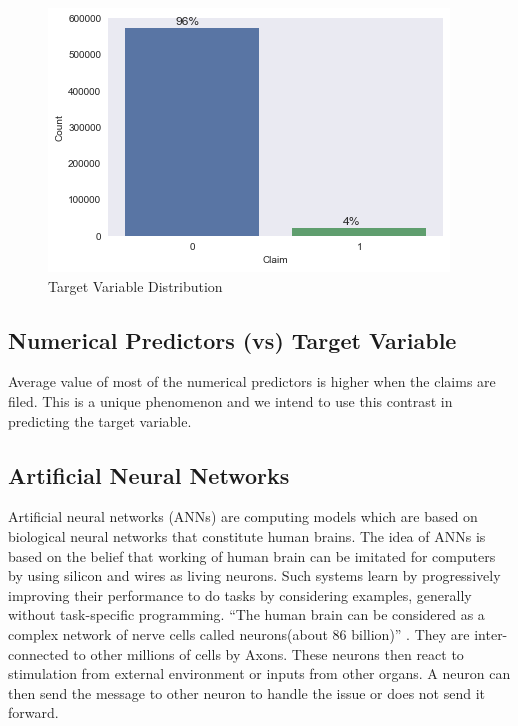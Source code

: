 \begin{figure}
 \centering\includegraphics[width=\columnwidth]{images/target}
 \caption{Target Variable Distribution}\label{f:numerical}
\end{figure}

\subsection{Numerical Predictors (vs) Target Variable}

 Average value of most of the numerical predictors is higher when the claims are filed. This is a unique phenomenon and we intend to use this contrast in predicting the target variable.
  
\subsection{Artificial Neural Networks}

Artificial neural networks (ANNs)  are computing models which are based on biological neural networks that constitute human brains. The idea of ANNs is based on the belief that working of human brain can be imitated for computers by using silicon and wires as living neurons. Such systems learn by progressively improving their performance to do tasks by considering examples, generally without task-specific programming. ``The human brain can be considered as a complex network of nerve cells called neurons(about 86 billion)'' \cite{Ainet}. They are inter-connected to other millions of cells by Axons. These neurons then react to stimulation from external environment or inputs from other organs. A neuron can then send the message to other neuron to handle the issue or does not send it forward. 

